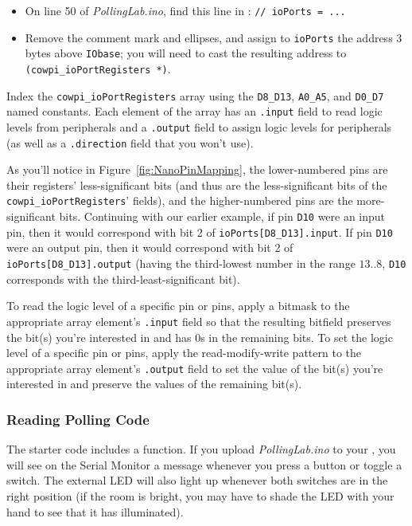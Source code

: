     \begin{itemize}
    \item On line 50 of \textit{PollingLab.ino}, find this line in
        : \lstinline{// ioPorts = ...}
    \item Remove the comment mark and ellipses, and assign to
        \lstinline{ioPorts} the address 3 bytes above \lstinline{IObase}; you
        will need to cast the resulting address to
        \lstinline{(cowpi_ioPortRegisters *)}.
    \end{itemize}

Index the \lstinline{cowpi_ioPortRegisters} array using the \lstinline{D8_D13},
\lstinline{A0_A5}, and \lstinline{D0_D7} named constants. Each element of the
array has an \lstinline{.input} field to read logic levels from peripherals and
a \lstinline{.output} field to assign logic levels for peripherals (as well as
a \lstinline{.direction} field that you won't use).

As you'll notice in Figure~\ref{fig:NanoPinMapping}, the lower-numbered pins
are their registers' less-significant bits (and thus are the less-significant
bits of the \lstinline{cowpi_ioPortRegisters}' fields), and the higher-numbered
pins are the more-significant bits. Continuing with our earlier example, if pin
\texttt{D10} were an input pin, then it would correspond with bit 2 of
\lstinline{ioPorts[D8_D13].input}. If pin \texttt{D10} were an output pin, then
it would correspond with bit 2 of \lstinline{ioPorts[D8_D13].output} (having the
third-lowest number in the range $13..8$, \texttt{D10} corresponds with the
third-least-significant bit).

To read the logic level of a specific pin or pins, apply a bitmask to the
appropriate array element's \lstinline{.input} field so that the resulting
bitfield preserves the bit(s) you're interested in and has 0s in the remaining
bits. To set the logic level of a specific pin or pins, apply the
read-modify-write pattern to the appropriate array element's
\lstinline{.output} field to set the value of the bit(s) you're interested in
and preserve the values of the remaining bit(s).

\subsubsection{Reading Polling Code}

The starter code includes a  function. If you upload
\textit{PollingLab.ino} to your \nano, you will see on the Serial Monitor a
message whenever you press a button or toggle a switch. The external LED will
also light up whenever both switches are in the right position (if the room is
bright, you may have to shade the LED with your hand to see that it has
illuminated).

